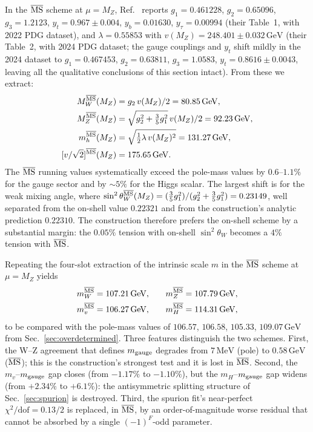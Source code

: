 \documentclass[twocolumn,aps,prd,floatfix,nofootinbib,superscriptaddress,10pt]{article}
\newcommand{\MW}{M_W}
\newcommand{\MZ}{M_Z}
\newcommand{\GeV}{\,\mathrm{GeV}}
\newcommand{\MeV}{\,\mathrm{MeV}}
\begin{document}
In the $\overline{\rm MS}$ scheme at $\mu=\MZ$, Ref.~\cite{AntuschHinzeSaad2026} reports $g_1 = 0.461228$, $g_2 = 0.65096$, $g_3 = 1.2123$, $y_t = 0.967\pm 0.004$, $y_b = 0.01630$, $y_\tau = 0.00994$ (their Table~1, with 2022 PDG dataset), and $\lambda = 0.55853$ with $v(\MZ)=248.401\pm 0.032\GeV$ (their Table~2, with 2024 PDG dataset; the gauge couplings and $y_t$ shift mildly in the 2024 dataset to $g_1=0.467453$, $g_2=0.63811$, $g_3=1.0583$, $y_t=0.8616\pm 0.0043$, leaving all the qualitative conclusions of this section intact).  From these we extract:
\begin{align}
\MW^{\overline{\rm MS}}(\MZ) &= g_2\, v(\MZ)/2 = 80.85\GeV, \\
\MZ^{\overline{\rm MS}}(\MZ) &= \sqrt{g_2^2 + \tfrac{3}{5}g_1^2}\, v(\MZ)/2 = 92.23\GeV, \\
m_h^{\overline{\rm MS}}(\MZ) &= \sqrt{\tfrac12\lambda\,v(\MZ)^2} = 131.27\GeV, \\
[v/\sqrt{2}]^{\overline{\rm MS}}(\MZ) &= 175.65\GeV.
\end{align}
The $\overline{\rm MS}$ running values systematically exceed the pole-mass values by $0.6$--$1.1\%$ for the gauge sector and by $\sim 5\%$ for the Higgs scalar. The largest shift is for the weak mixing angle, where $\sin^2\theta_W^{\overline{\rm MS}}(\MZ) = (\tfrac35 g_1^2)/(g_2^2 + \tfrac35 g_1^2) = 0.23149$, well separated from the on-shell value $0.22321$ and from the construction's analytic prediction $0.22310$. The construction therefore prefers the on-shell scheme by a substantial margin: the $0.05\%$ tension with on-shell $\sin^2\theta_W$ becomes a $4\%$ tension with $\overline{\rm MS}$.

Repeating the four-slot extraction of the intrinsic scale $m$ in the $\overline{\rm MS}$ scheme at $\mu=\MZ$ yields
\begin{equation}
\begin{aligned}
m_W^{\overline{\rm MS}}    &= 107.21\GeV, &\quad m_Z^{\overline{\rm MS}}    &= 107.79\GeV, \\
m_{v}^{\overline{\rm MS}}  &= 106.27\GeV, &\quad m_H^{\overline{\rm MS}}    &= 114.31\GeV,
\end{aligned}
\end{equation}
to be compared with the pole-mass values of $106.57$, $106.58$, $105.33$, $109.07\GeV$ from Sec.~\ref{sec:overdetermined}. Three features distinguish the two schemes. First, the W--Z agreement that defines $m_{\rm gauge}$ degrades from $7\MeV$ (pole) to $0.58\GeV$ ($\overline{\rm MS}$); this is the construction's strongest test and it is lost in $\overline{\rm MS}$. Second, the $m_v$--$m_{\rm gauge}$ gap closes (from $-1.17\%$ to $-1.10\%$), but the $m_H$--$m_{\rm gauge}$ gap widens (from $+2.34\%$ to $+6.1\%$): the antisymmetric splitting structure of Sec.~\ref{sec:spurion} is destroyed. Third, the spurion fit's near-perfect $\chi^2/\mathrm{dof}=0.13/2$ is replaced, in $\overline{\rm MS}$, by an order-of-magnitude worse residual that cannot be absorbed by a single $(-1)^F$-odd parameter.
\end{document}
